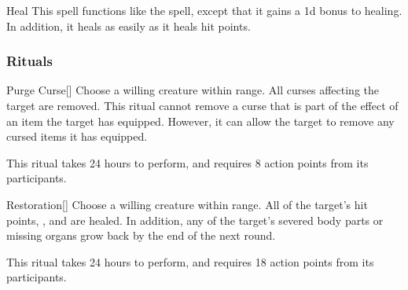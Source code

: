 \lowercase{\hypertarget{spell:Heal}{}}\label{spell:Heal}
\begin{ability}[\nth{4}]{\hypertarget{spell:Heal}{Heal}}
This spell functions like the  spell, except that it gains a \plus1d bonus to healing.
In addition, it heals  as easily as it heals hit points.
\end{ability}
\vspace{0.25em}



\subsubsection{Rituals}


\lowercase{\hypertarget{spell:Purge Curse}{}}\label{spell:Purge Curse}
\begin{ability}[\nth{2}]{\hypertarget{spell:Purge Curse}{Purge Curse}}[]
Choose a willing creature within \rngclose range.
All curses affecting the target are removed.
This ritual cannot remove a curse that is part of the effect of an item the target has equipped.
However, it can allow the target to remove any cursed items it has equipped.

This ritual takes 24 hours to perform, and requires 8 action points from its participants.
\end{ability}
\vspace{0.25em}



\lowercase{\hypertarget{spell:Restoration}{}}\label{spell:Restoration}
\begin{ability}[\nth{3}]{\hypertarget{spell:Restoration}{Restoration}}[]
Choose a willing creature within \rngclose range.
All of the target's hit points, , and  are healed.
In addition, any of the target's severed body parts or missing organs grow back by the end of the next round.

This ritual takes 24 hours to perform, and requires 18 action points from its participants.
\end{ability}
\vspace{0.25em}



